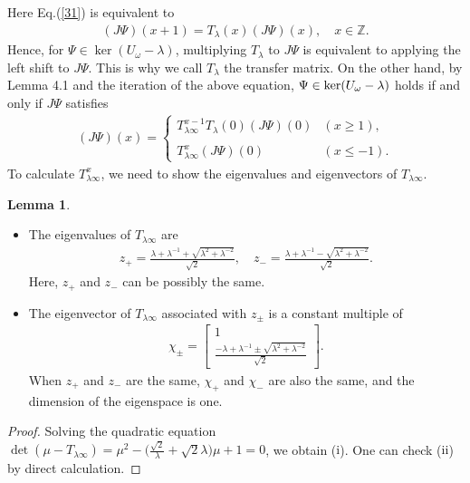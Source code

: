 \documentclass[a4paper,12pt]{article}
\theoremstyle{plain}
\theoremstyle{definition}
\newtheorem{lemma}[thm]{Lemma}
\theoremstyle{definition}
\begin{document}
Here Eq.(\ref{31}) is equivalent to
\begin{align*}
    (J\Psi)(x+1)=T_{\lambda}(x)(J\Psi) (x), \quad x \in \mathbb{Z}.
\end{align*}
Hence, for $\Psi \in \ker (U_{\omega}-\lambda)$, multiplying $T_{\lambda}$ to $J\Psi$ is equivalent to applying the left shift to $J\Psi$. This is why we call $T_{\lambda}$ the transfer matrix. On the other hand, by Lemma 4.1 and the iteration of the above equation, $\Psi \in {\rm ker}(U_{\omega}-\lambda)$ holds if and only if $J\Psi$ satisfies
\begin{eqnarray}
(J\Psi)(x)=
\left\{\begin{array}{ll}
T_{\lambda \infty}^{x-1}T_{\lambda}(0)(J\Psi)(0) & (x\geq 1), \\\\
T_{\lambda \infty}^{x}(J\Psi)(0) & (x\leq -1).
\end{array}\right. \label{0318}
\end{eqnarray} 
To calculate $T_{\lambda \infty}^x$, we need to show the eigenvalues and eigenvectors of $T_{\lambda \infty}$.
\begin{lemma}\label{lemma32}
\begin{itemize}
\item[(i)] The eigenvalues of $T_{\lambda \infty}$ are
\begin{eqnarray}
\label{4210}
z_{+} = \frac{\lambda +\lambda ^{-1}+\sqrt{\lambda^2 + \lambda^{-2}}}{\sqrt{2}},\quad z_{-}=\frac{\lambda +\lambda ^{-1}-\sqrt{\lambda^2 + \lambda^{-2}}}{\sqrt{2}}. 
\end{eqnarray}
Here, $z_+$ and $z_-$ can be possibly the same.
\item[(ii)]The eigenvector of $T_{\lambda \infty}$ associated with $z_{\pm}$ is a constant multiple of  
\begin{align}
\chi_{\pm} = 
\begin{bmatrix}
   1 \\
   \frac{-\lambda +\lambda^{-1}\pm \sqrt{\lambda^2 + \lambda^{-2}}}{\sqrt{2}}
\end{bmatrix}. \nonumber
\end{align}
When $z_+$ and $z_-$ are the same, $\chi_+$ and $\chi_-$ are also the same, and the dimension of the eigenspace is one.
\end{itemize}

\begin{proof}
Solving the quadratic equation
$
\det(\mu -T_{\lambda \infty})
= \mu^2 -\big(\frac{\sqrt{2}}{\lambda} + \sqrt{2}\lambda \big) \mu +1 =0
$, we obtain ($\mathrm{i}$). One can check ($\mathrm{ii}$) by direct calculation.
\end{proof}
\end{lemma}
\end{document}
